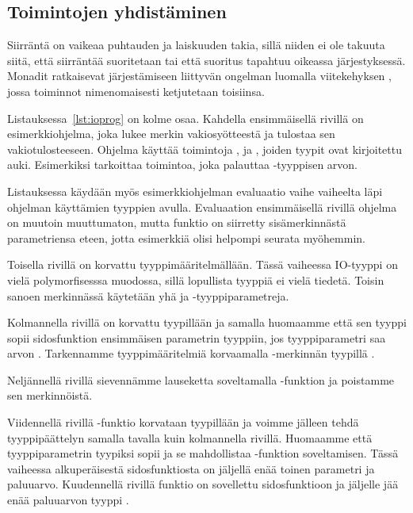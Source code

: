 \documentclass[finnish]{tktltiki2}
\begin{document}
\subsection{Toimintojen yhdistäminen} %


 Siirräntä on vaikeaa puhtauden ja laiskuuden takia, sillä
niiden ei ole takuuta siitä, että siirräntää suoritetaan tai että suoritus tapahtuu oikeassa
järjestyksessä. Monadit ratkaisevat järjestämiseen liittyvän ongelman luomalla viitekehyksen
, jossa toiminnot nimenomaisesti ketjutetaan toisiinsa.

Listauksessa~\ref{lst:ioprog} on kolme osaa. Kahdella ensimmäisellä rivillä on esimerkkiohjelma,
joka lukee merkin vakiosyötteestä ja tulostaa sen vakiotulosteeseen. Ohjelma käyttää toimintoja
,  ja \code{>>=}, joiden tyypit ovat kirjoitettu auki. Esimerkiksi
 tarkoittaa toimintoa, joka palauttaa -tyyppisen arvon.

Listauksessa käydään myös esimerkkiohjelman evaluaatio vaihe vaiheelta läpi ohjelman käyttämien
tyyppien avulla. Evaluaation ensimmäisellä rivillä ohjelma on muutoin muuttumaton, mutta
\code{(>>=)} funktio on siirretty sisämerkinnästä parametriensa eteen, jotta esimerkkiä olisi
helpompi seurata myöhemmin.

Toisella rivillä \code{(>>=)} on korvattu tyyppimääritelmällään. Tässä vaiheessa IO-tyyppi on vielä
polymorfisesssa muodossa, sillä lopullista tyyppiä ei vielä tiedetä. Toisin sanoen merkinnässä
käytetään yhä  ja  -tyyppiparametreja.

Kolmannella rivillä  on korvattu tyypillään ja samalla huomaamme että sen tyyppi sopii
sidosfunktion ensimmäisen parametrin tyyppiin, jos tyyppiparametri  saa arvon .
Tarkennamme tyyppimääritelmiä korvaamalla  -merkinnän tyypillä .

Neljännellä rivillä sievennämme lauseketta soveltamalla -funktion ja poistamme sen
merkinnöistä. 

Viidennellä rivillä -funktio korvataan tyypillään ja voimme jälleen tehdä
tyyppipäättelyn samalla tavalla kuin kolmannella rivillä. Huomaamme että tyyppiparametrin 
tyypiksi sopii \code{()} ja se mahdollistaa -funktion soveltamisen. Tässä vaiheessa
alkuperäisestä sidosfunktiosta on jäljellä enää toinen parametri ja paluuarvo. Kuudennellä rivillä
funktio  on sovellettu sidosfunktioon ja jäljelle jää enää paluuarvon tyyppi .
\end{document}
